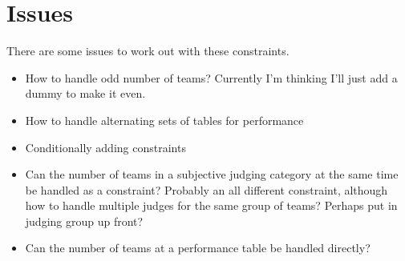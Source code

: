 \documentclass[letterpaper,11pt]{report}
\begin{document}
\section{Issues}
There are some issues to work out with these constraints.
\begin{itemize}
\item How to handle odd number of teams? Currently I'm thinking I'll just
  add a dummy to make it even.
\item How to handle alternating sets of tables for performance
\item Conditionally adding constraints
\item Can the number of teams in a subjective judging category at the same
  time be handled as a constraint? Probably an all different constraint,
  although how to handle multiple judges for the same group of teams?
  Perhaps put in judging group up front?
\item Can the number of teams at a performance table be handled directly?
\end{itemize}
\end{document}
